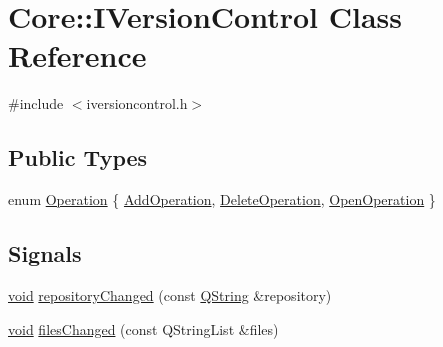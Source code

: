 \hypertarget{class_core_1_1_i_version_control}{\section{\-Core\-:\-:\-I\-Version\-Control \-Class \-Reference}
\label{class_core_1_1_i_version_control}
}


{\ttfamily \#include $<$iversioncontrol.\-h$>$}

\subsection*{\-Public \-Types}
\begin{DoxyCompactItemize}
\item 
enum \hyperlink{group___core_plugin_gaf73287914241594ba6e179f65b63bd61}{\-Operation} \{ \hyperlink{group___core_plugin_ggaf73287914241594ba6e179f65b63bd61ab53ae2491f4fe42036cf680c3cc1b67b}{\-Add\-Operation}, 
\hyperlink{group___core_plugin_ggaf73287914241594ba6e179f65b63bd61ac0e72d90e10b995397b0c578ea5a3875}{\-Delete\-Operation}, 
\hyperlink{group___core_plugin_ggaf73287914241594ba6e179f65b63bd61a4afe4a1145dbcd2b6f7ebdda837ad06a}{\-Open\-Operation}
 \}
\end{DoxyCompactItemize}
\subsection*{\-Signals}
\begin{DoxyCompactItemize}
\item 
\hyperlink{group___u_a_v_objects_plugin_ga444cf2ff3f0ecbe028adce838d373f5c}{void} \hyperlink{group___core_plugin_ga762e65b1f740933d64ce68588d54d456}{repository\-Changed} (const \hyperlink{group___u_a_v_objects_plugin_gab9d252f49c333c94a72f97ce3105a32d}{\-Q\-String} \&repository)
\item 
\hyperlink{group___u_a_v_objects_plugin_ga444cf2ff3f0ecbe028adce838d373f5c}{void} \hyperlink{group___core_plugin_gaa10b98dc0dcebd4599492c770830a3bf}{files\-Changed} (const \-Q\-String\-List \&files)
\end{DoxyCompactItemize}
